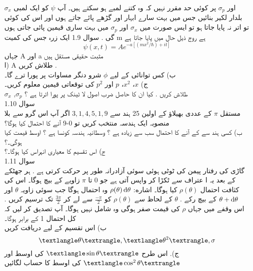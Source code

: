 \documentclass{book}
\begin{document}
\(\sigma _{x} \) 
اور 
\(\sigma _{p} \) 
پر کوئی حد مقرر نہیں کہ وہ کتنے لمبے ہو سکتے ہیں۔ آپ
\(\psi\) 
کو ایک لمبی بلدار لکیر بنائیں جس میں بہت سارے ابہار اور گڑھے پائے جاتے ہوں اور اس کی کوئی تو اتر نہ پایا جاتا ہو تو ایس صورت میں
\(\sigma _{x} \) 
اور
\(\sigma _{p} \) 
میں بہت ساری قیمین پائی جاتی ہوں گی .
سوال  1.9
ایک زرہ جس کی کمیت
m
ہے روج ذیل حال میں پایا جاتا ہے 
\[\psi (x,t)=Ae^{-a[(mx^{2}/\hbar)+it]}\]
جہاں
A
اور
a
مثبت حقیقی مستقل ہیں \\
ا)
A
طلاش کریں .\\
ب)
کس توانائی کے لیے
\(\phi\)
شرو دنگر مساوات پر پورا ترے گا۔\\
ج) 
\(x\)،
\(x^{2}\)،
\(p\)
اور
\(p^{2}\)
کی توقعاتی قیمین معلوم کریں۔\\
\(\sigma _{x} \) ,\(\sigma _{p} \) 
طلاش کریں . کیا ان کا حاصل ضرب اصول لا ٹینک پر پورا اترتا ہے ؟\\
سوال 
1.10\\
مستقل
\(\pi\)
کے عددی بھیلاؤ کے اولین
25
ہند سے
\(3,1,4,5,1,9\)
اگر آپ اس گرو سے بلا منصوبہ ایک ہندسہ منتخب کریں تو 
0-9
آنے کا احتمال کیا ہوگا؟\\
ب) کسی ہند سے کے آنے کا احتمال سب سے زیادہ ہے ؟
وسطانیہ ہندسہ کونسا ہے ؟
اوسط قیمت کیا ہوگی۔؟\\
 ج) اس تقسیم کا معیاری انہراس کیا ہوگا۔؟\\
سوال 
1.11\\
گاڑی کی رفتار پیمن کی ٹوٹی ہوئی سوئی آزادرانہ طور پر حرکت کرتی ہے . ہر جھٹکے کے بعد یہ ا عتراف سے ٹکڑا کر واپس آتی ہے جو 0 تا
\(\pi\)
زاویے کے بیچ ہوگا۔
اس کی کثافت احتمال
\(\rho (\theta)\)
کیا ہوگا۔ اشاره:
\(\rho (\theta)\dif{\theta}\)
وہ احتمال ہوگا جب سوئی زاویہ 
\(\theta\)
اور
\(\theta+\dif{\theta}\)
کے بیچ رکے .
\(\theta\)
کے لحاظ سے
\(\rho(\theta)\)
کو
\(\frac{-\pi}{2}\)
سے لے کر
\(\frac{3\pi}{2}\)
تک ترسیم کریں . اس وقفے میں جہاں
\(\rho\)
کی قیمت صفر ہوگی وہ شامل نہیں ہوگا۔ آپ تصدیق کر لیں کہ کل احتمال 1 کے برابر ہوگا۔\\
ب)
اس تقسیم کے لیے دریافت کریں \\
\[\textlangle \theta \textrangle, \textlangle \theta ^{2} \textrangle, \sigma\]
ج). اس طرح
\(\textlangle\sin{\theta}\textrangle\)
کی اوسط
اور
\(\textlangle\cos ^{2}\theta\textrangle\)
کی اوسط کا حساب لگائیں\\
\end{document}
